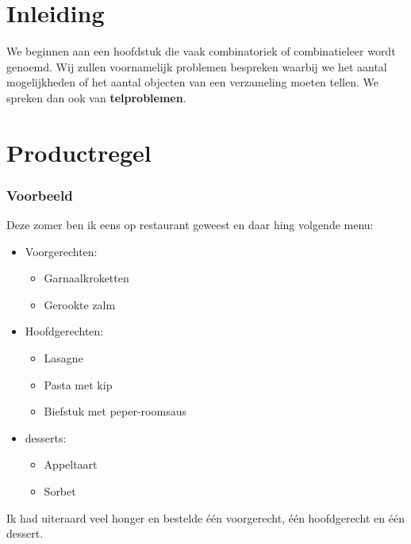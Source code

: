 \documentclass[12pt,twoside]{article}
\begin{document}
\thispagestyle{empty}
\mbox{}
\newpage
\clearpage
\thispagestyle{empty}
\mbox{}
\newpage
\clearpage
{} 

\fancyhead[RE,LO]{}

\section{Inleiding}

We beginnen aan een hoofdstuk die vaak combinatoriek of combinatieleer wordt genoemd. Wij zullen voornamelijk problemen bespreken waarbij we het aantal mogelijkheden of het aantal objecten van een verzameling moeten tellen. We spreken dan ook van {\bf telproblemen}.

\section{Productregel}

\subsubsection*{Voorbeeld}

Deze zomer ben ik eens op restaurant geweest en daar hing volgende menu:

\begin{mdframed}
\begin{itemize}
  \item Voorgerechten:
  \begin{itemize}
    \item Garnaalkroketten
    \item Gerookte zalm
  \end{itemize}
  \item Hoofdgerechten:
  \begin{itemize}
    \item Lasagne
    \item Pasta met kip
    \item Biefstuk met peper-roomsaus
  \end{itemize}
  \item desserts:
  \begin{itemize}
    \item Appeltaart
    \item Sorbet
  \end{itemize}
\end{itemize}
\end{mdframed}

Ik had uiteraard veel honger en bestelde één voorgerecht, één hoofdgerecht en één dessert.
\end{document}
